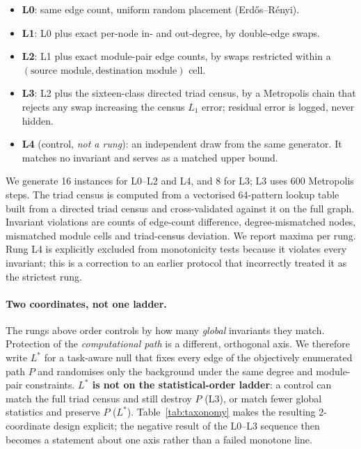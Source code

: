\documentclass[10pt,twocolumn,letterpaper]{article}
\begin{document}
\begin{itemize}
\item \textbf{L0}: same edge count, uniform random placement (Erd\H{o}s--R\'enyi).
\item \textbf{L1}: L0 plus exact per-node in- and out-degree, by double-edge swaps.
\item \textbf{L2}: L1 plus exact module-pair edge counts, by swaps restricted
  within a $(\text{source module},\text{destination module})$ cell.
\item \textbf{L3}: L2 plus the sixteen-class directed triad census, by a
  Metropolis chain that rejects any swap increasing the census $L_1$ error;
  residual error is logged, never hidden.
\item \textbf{L4} (control, \emph{not a rung}): an independent draw from the
  same generator. It matches no invariant and serves as a matched upper bound.
\end{itemize}

We generate 16 instances for L0--L2 and L4, and 8 for L3;
L3 uses 600 Metropolis steps. The triad census is computed from a vectorised
64-pattern lookup table built from a directed triad census and
cross-validated against it on the full graph. Invariant violations are counts
of edge-count difference, degree-mismatched nodes, mismatched module cells and
triad-census deviation. We report maxima per rung. Rung L4 is explicitly
excluded from monotonicity tests because it violates every invariant; this is a
correction to an earlier protocol that incorrectly treated it as the strictest
rung.

\paragraph{Two coordinates, not one ladder.}
The rungs above order controls by how many \emph{global} invariants they match.
Protection of the \emph{computational path} is a different, orthogonal axis.
We therefore write $L^*$ for a task-aware null that fixes every edge of the
objectively enumerated path $P$ and randomises only the background under the
same degree and module-pair constraints. \textbf{$L^*$ is not on the
statistical-order ladder}: a control can match the full triad census and still
destroy $P$ (L3), or match fewer global statistics and preserve $P$ ($L^*$).
Table~\ref{tab:taxonomy} makes the resulting $2$-coordinate design explicit;
the negative result of the L0--L3 sequence then becomes a statement about one
axis rather than a failed monotone line.
\end{document}
